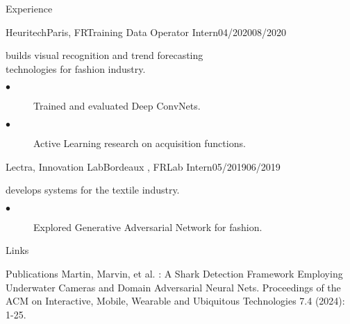 \documentclass{resume}
\begin{document}
\begin{multicols}{2}
\begin{rSection}{\Large Experience}
		\begin{job}{Heuritech}{Paris, FR}{Training Data Operator Intern}{04/2020}{08/2020}{
			builds visual recognition and trend forecasting \\ technologies for fashion industry.
			\begin{description}
				\item[$\bullet$] Trained and evaluated Deep ConvNets.
				\item[$\bullet$] Active Learning research on acquisition functions.
			\end{description}
		}
		\end{job}
		\begin{job}{Lectra, Innovation Lab}{Bordeaux , FR}{Lab Intern}{05/2019}{06/2019}{
			develops systems for the textile industry.
			\begin{description}
				\item[$\bullet$] Explored Generative Adversarial Network for fashion.
			\end{description}
		}
		\end{job}
	\end{rSection}
	
	\columnbreak
	
	\begin{rSection}{\Large Links}
	\end{rSection}
	
	\begin{rSection}{\Large Publications}
	Martin, Marvin, et al. : A Shark Detection Framework Employing Underwater Cameras and Domain Adversarial Neural Nets. Proceedings of the ACM on Interactive, Mobile, Wearable and Ubiquitous Technologies 7.4 (2024): 1-25.
	\end{rSection}


\end{multicols}
\end{document}

